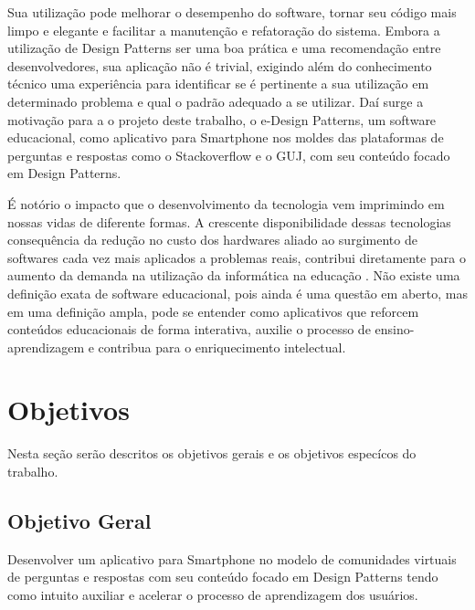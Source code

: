 Sua utilização pode melhorar o desempenho do software, tornar seu código mais limpo e elegante e facilitar a manutenção e refatoração do sistema. Embora a utilização 
de Design Patterns ser uma boa prática e uma recomendação entre desenvolvedores, sua aplicação não é trivial, exigindo além do conhecimento técnico  
uma experiência para identificar se é pertinente a sua utilização em determinado problema e  qual o padrão adequado a se utilizar. Daí surge a motivação para a 
o projeto deste trabalho, o e-Design Patterns,  um software educacional, como aplicativo para Smartphone nos moldes das plataformas de perguntas e respostas 
como o Stackoverflow e o GUJ, com seu conteúdo focado em Design Patterns.

É notório o impacto que o desenvolvimento da tecnologia vem imprimindo em nossas vidas de diferente formas. A crescente disponibilidade dessas 
tecnologias consequência da redução no custo dos hardwares aliado ao surgimento de softwares cada vez mais aplicados a problemas reais, contribui
 diretamente para o aumento da demanda na utilização da informática na educação \cite{brandao1998repensando}. 
Não existe uma definição exata de software educacional, pois ainda é uma questão em aberto, mas em uma definição ampla, pode se entender como 
aplicativos que reforcem conteúdos educacionais de forma interativa, auxilie o processo de ensino-aprendizagem e contribua para o enriquecimento
 intelectual\cite{oliveira2001proposta}.


\section{Objetivos}%
Nesta seção serão descritos os objetivos gerais e os objetivos especícos do trabalho.

\subsection{Objetivo Geral}%

Desenvolver um aplicativo para Smartphone no modelo de comunidades virtuais de perguntas e respostas com seu conteúdo focado em Design Patterns tendo como intuito auxiliar e acelerar o processo de aprendizagem dos usuários.

